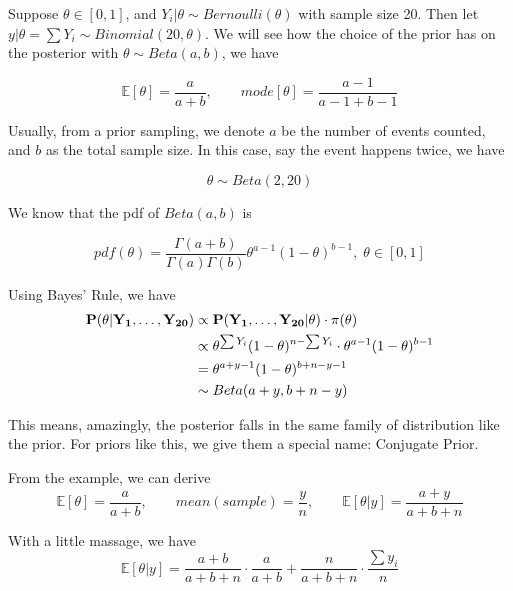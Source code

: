 \begin{example}
    Suppose $\theta \in [0,1]$, and $Y_i|\theta \sim Bernoulli(\theta)$ with sample size 20. Then let $y|\theta = \sum Y_i \sim Binomial(20, \theta)$. We will see how the choice of the prior has on the posterior with $\theta \sim Beta(a,b)$, we have
    
    \begin{equation*}
        \mathbb{E}[\theta] = \frac{a}{a+b}, \qquad mode[\theta] = \frac{a-1}{a-1+b-1}
    \end{equation*}

    Usually, from a prior sampling, we denote $a$ be the number of events counted, and $b$ as the total sample size. In this case, say the event happens twice, we have

    \begin{equation*}
        \theta \sim Beta(2, 20)
    \end{equation*}

    We know that the pdf of $Beta(a,b)$ is 

    \begin{equation*}
        pdf(\theta) = \frac{\Gamma(a + b)}{\Gamma(a)\Gamma(b)}\theta^{a-1}(1-\theta)^{b-1}, \; \theta \in [0,1]
    \end{equation*}

    Using Bayes' Rule, we have 
    \begin{align*}
        \bf{P}(\theta|Y_1, \ldots, Y_{20}) &\propto \bf{P}(Y_1, \ldots, Y_{20}|\theta) \cdot \pi(\theta) \\
        &\propto \theta^{\sum Y_i}(1-\theta)^{n - \sum Y_i} \cdot \theta^{a-1}(1-\theta)^{b-1} \\
        &=\theta^{a + y - 1} (1-\theta)^{b + n - y - 1}\\
        &\sim Beta(a + y, b + n - y)
    \end{align*}

    This means, amazingly, the posterior falls in the same family of distribution like the prior. For priors like this, we give them a special name: Conjugate Prior. 
\end{example}

From the example, we can derive
\begin{equation*}
    \mathbb{E}[\theta] = \frac{a}{a+b}, \qquad mean(sample) = \frac{y}{n}, \qquad \mathbb{E}[\theta | y] = \frac{a + y}{a+ b + n}
\end{equation*}

With a little massage, we have
\begin{equation*}
    \mathbb{E}[\theta|y] = \frac{a+b}{a+b+n} \cdot \frac{a}{a+b} + \frac{n}{a+b+n} \cdot \frac{\sum y_i}{n}
\end{equation*}


